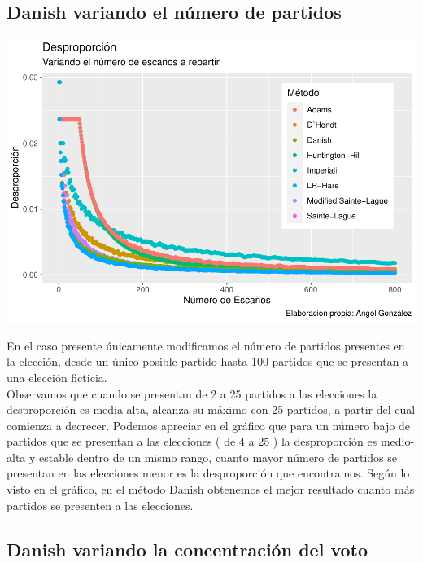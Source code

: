 \documentclass[12pt,a4paper,]{book}
\numberwithin{dummy}{section}
\theoremstyle{ocrenumbox}
\theoremstyle{blacknumex}
\theoremstyle{blacknumbox}
\theoremstyle{ocrenum}
\theoremstyle{ocrenum}
\begin{document}
\hypertarget{danish-variando-el-nuxfamero-de-partidos}{%
\subsection{Danish variando el número de
partidos}\label{danish-variando-el-nuxfamero-de-partidos}}

\begin{center}\includegraphics[width=0.95\linewidth]{figurasR/unnamed-chunk-44-1} \end{center}

En el caso presente únicamente modificamos el número de partidos
presentes en la elección, desde un único posible partido hasta 100
partidos que se presentan a una elección ficticia.\\
Observamos que cuando se presentan de 2 a 25 partidos a las elecciones
la desproporción es media-alta, alcanza su máximo con 25 partidos, a
partir del cual comienza a decrecer. Podemos apreciar en el gráfico que
para un número bajo de partidos que se presentan a las elecciones ( de 4
a 25 ) la desproporción es medio-alta y estable dentro de un mismo
rango, cuanto mayor número de partidos se presentan en las elecciones
menor es la desproporción que encontramos. Según lo visto en el gráfico,
en el método Danish obtenemos el mejor resultado cuanto más partidos se
presenten a las elecciones.

\hypertarget{danish-variando-la-concentraciuxf3n-del-voto}{%
\subsection{Danish variando la concentración del
voto}\label{danish-variando-la-concentraciuxf3n-del-voto}}
\end{document}
